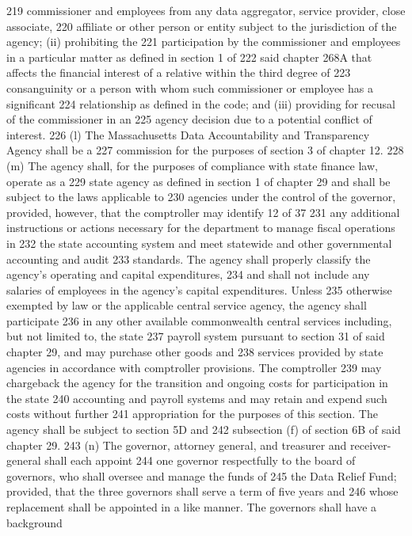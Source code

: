 219 commissioner and employees from any data aggregator, service provider, close associate,
220 affiliate or other person or entity subject to the jurisdiction of the agency; (ii) prohibiting the
221 participation by the commissioner and employees in a particular matter as defined in section 1 of
222 said chapter 268A that affects the financial interest of a relative within the third degree of
223 consanguinity or a person with whom such commissioner or employee has a significant
224 relationship as defined in the code; and (iii) providing for recusal of the commissioner in an
225 agency decision due to a potential conflict of interest.
226 (l) The Massachusetts Data Accountability and Transparency Agency shall be a
227 commission for the purposes of section 3 of chapter 12.
228 (m) The agency shall, for the purposes of compliance with state finance law, operate as a
229 state agency as defined in section 1 of chapter 29 and shall be subject to the laws applicable to
230 agencies under the control of the governor, provided, however, that the comptroller may identify
12 of 37
231 any additional instructions or actions necessary for the department to manage fiscal operations in
232 the state accounting system and meet statewide and other governmental accounting and audit
233 standards. The agency shall properly classify the agency’s operating and capital expenditures,
234 and shall not include any salaries of employees in the agency’s capital expenditures. Unless
235 otherwise exempted by law or the applicable central service agency, the agency shall participate
236 in any other available commonwealth central services including, but not limited to, the state
237 payroll system pursuant to section 31 of said chapter 29, and may purchase other goods and
238 services provided by state agencies in accordance with comptroller provisions. The comptroller
239 may chargeback the agency for the transition and ongoing costs for participation in the state
240 accounting and payroll systems and may retain and expend such costs without further
241 appropriation for the purposes of this section. The agency shall be subject to section 5D and
242 subsection (f) of section 6B of said chapter 29.
243 (n) The governor, attorney general, and treasurer and receiver-general shall each appoint
244 one governor respectfully to the board of governors, who shall oversee and manage the funds of
245 the Data Relief Fund; provided, that the three governors shall serve a term of five years and
246 whose replacement shall be appointed in a like manner. The governors shall have a background

